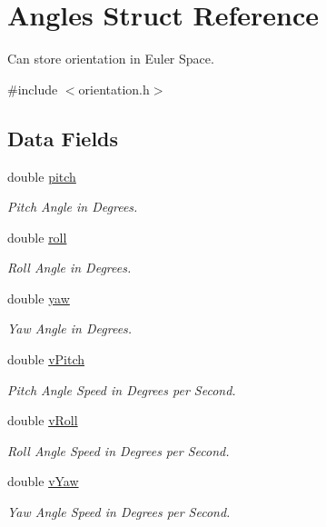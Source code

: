 \hypertarget{struct_angles}{\section{Angles Struct Reference}
\label{struct_angles}
}


Can store orientation in Euler Space.  




{\ttfamily \#include $<$orientation.\-h$>$}

\subsection*{Data Fields}
\begin{DoxyCompactItemize}
\item 
double \hyperlink{struct_angles_a34c057a0378030db67bd6a129f37d938}{pitch}
\begin{DoxyCompactList}\small\item\em Pitch Angle in Degrees. \end{DoxyCompactList}\item 
double \hyperlink{struct_angles_a1d3228afa3a1d6773954f40c1e519eb9}{roll}
\begin{DoxyCompactList}\small\item\em Roll Angle in Degrees. \end{DoxyCompactList}\item 
double \hyperlink{struct_angles_a21cd490f6191f66678f55b4c242a10cf}{yaw}
\begin{DoxyCompactList}\small\item\em Yaw Angle in Degrees. \end{DoxyCompactList}\item 
double \hyperlink{struct_angles_acd2ab495f15d37525f00fa358444a7e8}{v\-Pitch}
\begin{DoxyCompactList}\small\item\em Pitch Angle Speed in Degrees per Second. \end{DoxyCompactList}\item 
double \hyperlink{struct_angles_ae5dfe118046f69d156389c62c33de4fc}{v\-Roll}
\begin{DoxyCompactList}\small\item\em Roll Angle Speed in Degrees per Second. \end{DoxyCompactList}\item 
double \hyperlink{struct_angles_a87a17eab9b8d06fdb255aae737aedcbf}{v\-Yaw}
\begin{DoxyCompactList}\small\item\em Yaw Angle Speed in Degrees per Second. \end{DoxyCompactList}\end{DoxyCompactItemize}


